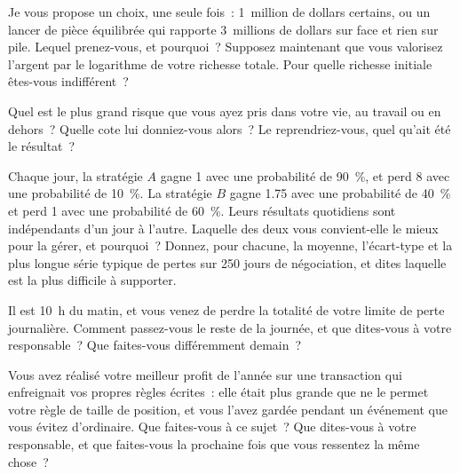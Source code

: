 \begin{question}\label{iq:iv2:behavioural-and-fit:24}
Je vous propose un choix, une seule fois~: 1~million de dollars certains, ou un lancer de pièce équilibrée qui rapporte 3~millions de dollars sur face et rien sur pile. Lequel prenez-vous, et pourquoi~? Supposez maintenant que vous valorisez l'argent par le logarithme de votre richesse totale. Pour quelle richesse initiale êtes-vous indifférent~?
\end{question}

\begin{question}\label{iq:iv2:behavioural-and-fit:25}
Quel est le plus grand risque que vous ayez pris dans votre vie, au travail ou en dehors~? Quelle cote lui donniez-vous alors~? Le reprendriez-vous, quel qu'ait été le résultat~?
\end{question}

\begin{question}\label{iq:iv2:behavioural-and-fit:26}
Chaque jour, la stratégie $A$ gagne 1 avec une probabilité de 90~\%, et perd 8 avec une probabilité de 10~\%. La stratégie $B$ gagne 1.75 avec une probabilité de 40~\% et perd 1 avec une probabilité de 60~\%. Leurs résultats quotidiens sont indépendants d'un jour à l'autre. Laquelle des deux vous convient-elle le mieux pour la gérer, et pourquoi~? Donnez, pour chacune, la moyenne, l'écart-type et la plus longue série typique de pertes sur 250 jours de négociation, et dites laquelle est la plus difficile à supporter.
\end{question}

\begin{question}\label{iq:iv2:behavioural-and-fit:27}
Il est 10~h du matin, et vous venez de perdre la totalité de votre limite de perte journalière. Comment passez-vous le reste de la journée, et que dites-vous à votre responsable~? Que faites-vous différemment demain~?
\end{question}

\begin{question}\label{iq:iv2:behavioural-and-fit:28}
Vous avez réalisé votre meilleur profit de l'année sur une transaction qui enfreignait vos propres règles écrites~: elle était plus grande que ne le permet votre règle de taille de position, et vous l'avez gardée pendant un événement que vous évitez d'ordinaire. Que faites-vous à ce sujet~? Que dites-vous à votre responsable, et que faites-vous la prochaine fois que vous ressentez la même chose~?
\end{question}

